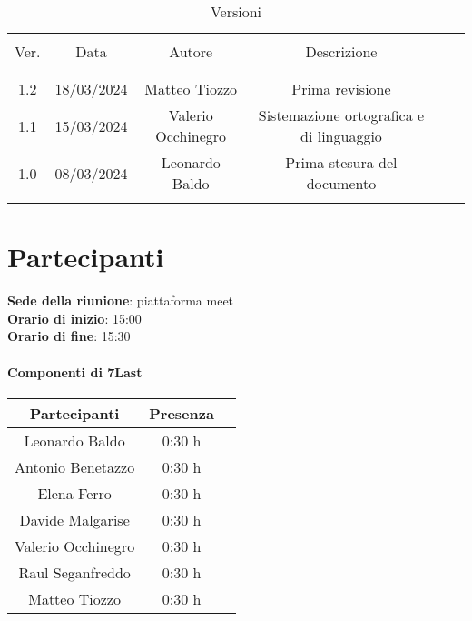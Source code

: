 \documentclass[italian,12pt]{article} %
\begin{document}


\newpage





\begin{table}[!h]
	\caption{Versioni}
	\begin{center}
		\begin{tabular}{ c c c c c c }
			\hline \\[-2ex]
			Ver. & Data & Autore & Descrizione \\
			\\[-2ex] \hline \\[-1.5ex]
			1.2 & 18/03/2024 & Matteo Tiozzo & Prima revisione \\
			1.1 & 15/03/2024 & Valerio Occhinegro& Sistemazione ortografica e di linguaggio  \\
			1.0 & 08/03/2024 & Leonardo Baldo& Prima stesura del documento \\
			\\[-1.5ex] \hline
		\end{tabular}
	\end{center}
\end{table}
\newpage

\tableofcontents

\newpage
\section{Partecipanti}

\textbf{Sede della riunione}: piattaforma meet\\
\textbf{Orario di inizio}: 15:00\\
\textbf{Orario di fine}: 15:30\\


\paragraph{Componenti di 7Last}

\begin{flushleft}
\begin{table}[!h]
\begin{tabular}{ |c|c|c| } 
	\hline
	\textbf{Partecipanti} & \textbf{Presenza} \\
	\hline 
	Leonardo Baldo 		 & 0:30 h \\ 
	Antonio Benetazzo 	 & 0:30 h \\
	Elena Ferro 		 & 0:30 h \\
	Davide Malgarise 	 & 0:30 h \\
	Valerio Occhinegro 	 & 0:30 h \\
	Raul Seganfreddo 	 & 0:30 h \\
	Matteo Tiozzo 		 & 0:30 h \\ 
	\hline
\end{tabular}
\end{table}
\end{flushleft}
\end{document}
